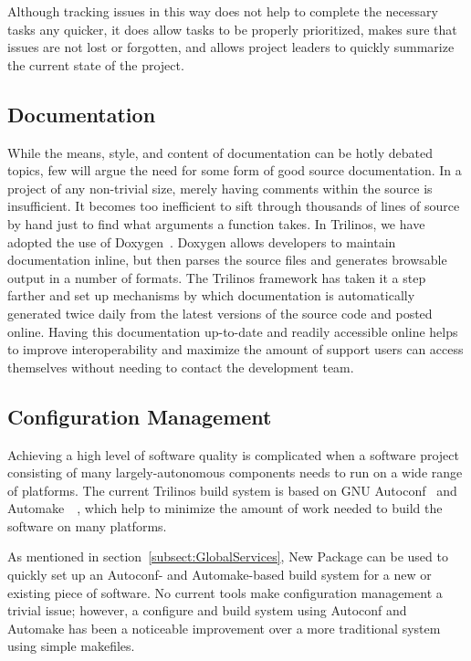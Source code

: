 \documentclass{doublecol}
\begin{document}
Although tracking issues in this way does not help to complete the
necessary tasks any quicker, it does allow tasks to be properly
prioritized, makes sure that issues are not lost or forgotten, and
allows project leaders to quickly summarize the current state of the
project.

\subsection{Documentation}


While the means, style, and content of documentation can be hotly
debated topics, few will argue the need for some form of good source
documentation. In a project of any non-trivial size, merely having
comments within the source is insufficient.  It becomes too
inefficient to sift through thousands of lines of source by hand
just to find what arguments a function takes.  In Trilinos, we have
adopted the use of Doxygen~\cite{Doxygen}.  Doxygen allows
developers to maintain documentation inline, but then parses the
source files and generates browsable output in a number of formats.
The Trilinos framework has taken it a step farther and set up
mechanisms by which documentation is automatically generated twice
daily from the latest versions of the source code and posted online.
Having this documentation up-to-date and readily accessible online
helps to improve interoperability and maximize the amount of support
users can access themselves without needing to contact the
development team.

\subsection{Configuration Management}


Achieving a high level of software quality is complicated when a
software project consisting of many largely-autonomous components
needs to run on a wide range of platforms.  The current Trilinos
build system is based on GNU Autoconf~\cite{Autoconf} and
Automake~\cite{Automake}~\cite{GoatBook}, which help to minimize the
amount of work needed to build the software on many platforms.

As mentioned in section~\ref{subsect:GlobalServices}, New Package
can be used to quickly set up an Autoconf- and Automake-based build
system for a new or existing piece of software.  No current tools
make configuration management a trivial issue; however, a configure
and build system using Autoconf and Automake has been a noticeable
improvement over a more traditional system using simple makefiles.
\end{document}
